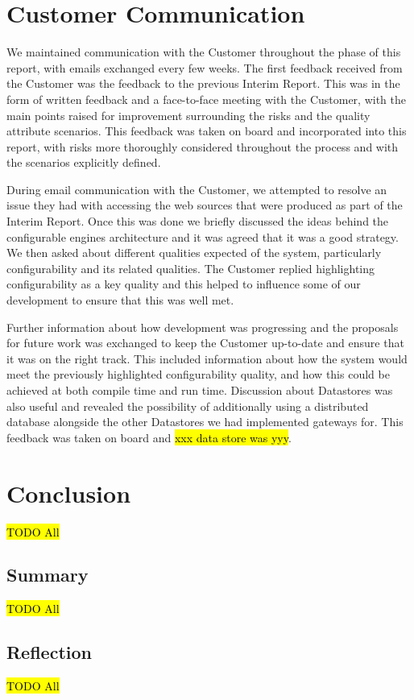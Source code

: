 \documentclass[10pt,a4paper]{article}
\begin{document}
\section{Customer Communication}
\label{sec:customer_comms}

We maintained communication with the Customer throughout the phase of this report, with emails exchanged every few weeks. The first feedback received from the Customer was the feedback to the previous Interim Report. This was in the form of written feedback and a face-to-face meeting with the Customer, with the main points raised for improvement surrounding the risks and the quality attribute scenarios. This feedback was taken on board and incorporated into this report, with risks more thoroughly considered throughout the process and with the scenarios explicitly defined.

During email communication with the Customer, we attempted to resolve an issue they had with accessing the web sources that were produced as part of the Interim Report. Once this was done we briefly discussed the ideas behind the configurable engines architecture and it was agreed that it was a good strategy. We then asked about different qualities expected of the system, particularly configurability and its related qualities. The Customer replied highlighting configurability as a key quality and this helped to influence some of our development to ensure that this was well met.

Further information about how development was progressing and the proposals for future work was exchanged to keep the Customer up-to-date and ensure that it was on the right track. This included information about how the system would meet the previously highlighted configurability quality, and how this could be achieved at both compile time and run time. Discussion about Datastores was also useful and revealed the possibility of additionally using a distributed database alongside the other Datastores we had implemented gateways for. This feedback was taken on board and \hl{xxx data store was yyy}.


\section{Conclusion}
\label{sec:conclusion}
\hl{TODO All}

\subsection{Summary}
\label{sec:summary}
\hl{TODO All}

\subsection{Reflection}
\label{sec:reflection}
\hl{TODO All}



\end{document}
